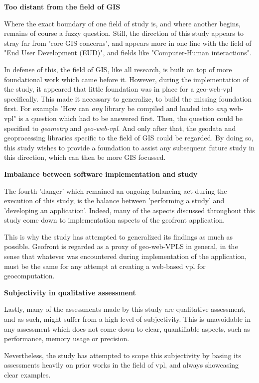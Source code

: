 \textbf{Too distant from the field of GIS}

Where the exact boundary of one field of study is, and where another begins, remains of course a fuzzy question. 
Still, the direction of this study appears to stray far from 'core GIS concerns', and appears more in one line with the  field of "End User Development (EUD)", and fields like "Computer-Human interactions". 

In defense of this, the field of GIS, like all research, is built on top of more foundational work which came before it. 
However, during the implementation of the study, it appeared that little foundation was in place for a geo-web-vpl specifically. 
This made it necessary to generalize, to build the missing foundation first.
For example "How can \emph{any} library be compiled and loaded into \emph{any} web-vpl" is a question which had to be answered first. 
Then, the question could be specified to \emph{geometry} and \emph{geo-web-vpl}. 
And only after that, the geodata and geoprocessing libraries specific to the field of GIS could be regarded. 
By doing so, this study wishes to provide a foundation to assist any subsequent future study in this direction, which can then be more GIS focussed.

\textbf{Imbalance between software implementation and study}

The fourth 'danger' which remained an ongoing balancing act during the execution of this study, is the balance between 'performing a study' and 'developing an application'. 
Indeed, many of the aspects discussed throughout this study come down to implementation aspects of the geofront application. 

This is why the study has attempted to generalized its findings as much as possible.
Geofront is regarded as a proxy of geo-web-VPLS in general, in the sense that whatever was encountered during implementation of the application, must be the same for any attempt at creating a web-based vpl for geocomputation.


\textbf{Subjectivity in qualitative assessment}

Lastly, many of the assessments made by this study are qualitative assessment, and as such, might suffer from a high level of subjectivity. 
This is unavoidable in any assessment which does not come down to clear, quantifiable aspects, such as performance, memory usage or precision. 

Nevertheless, the study has attempted to scope this subjectivity by basing its assessments heavily on prior works in the field of vpl, and always showcasing clear examples. 


